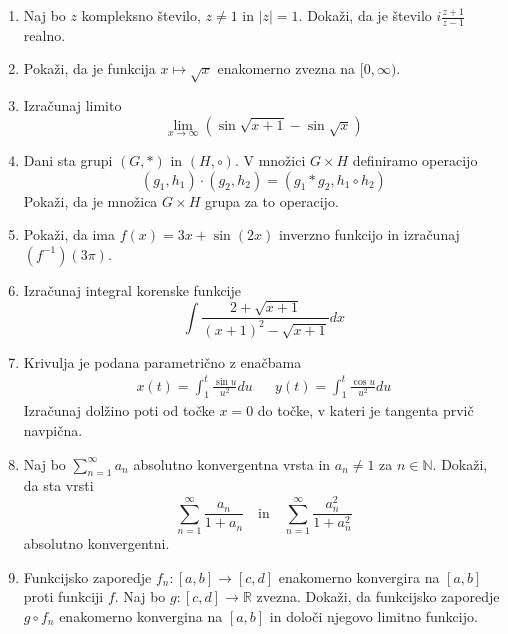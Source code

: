 \documentclass[a4paper,12pt]{article}
\begin{document}
\begin{enumerate}
    \item Naj bo \(z\) kompleksno število, \(z \neq 1\) in \(\left| z \right| = 1\). Dokaži, da je število \(i \frac{z + 1}{z - 1}\) realno.

    \item Pokaži, da je funkcija \(x \mapsto \sqrt{x}\) enakomerno zvezna na \([0, \infty)\).

    \item Izračunaj limito 
            \[
                \lim_{x \rightarrow \infty}{(\sin\sqrt{x + 1} - \sin\sqrt{x})}
            \]

    \item Dani sta grupi \((G, \ast)\) in \((H, \circ)\). V množici \(G \times H\) definiramo operacijo \[
       (g_1, h_1) \cdot (g_2, h_2) = (g_1 \ast g_2, h_1 \circ h_2) 
    \]
        Pokaži, da je množica \(G \times H\) grupa za to operacijo.

    \item Pokaži, da ima \(f(x) = 3x + \sin(2x)\) inverzno funkcijo in izračunaj \((f^{-1})(3\pi)\).

    \item Izračunaj integral korenske funkcije \[
        \int{\frac{2+\sqrt{x + 1}}{(x+1)^2 - \sqrt{x + 1}}dx}
    \]

    \item {
        Krivulja je podana parametrično z enačbama
        \begin{align}
            x(t) = \int_1^t{\frac{\sin u}{u^2}du} && y(t) = \int_1^t{\frac{\cos{u}}{u^2}du} \nonumber
        \end{align}
        Izračunaj dolžino poti od točke \(x = 0\) do točke, v kateri je tangenta prvič navpična.
    }

    \item {
        Naj bo \(\sum_{n=1}^{\infty} a_n\) absolutno konvergentna vrsta in \(a_n \neq 1\) za \(n \in \mathbb{N}\).
        Dokaži, da sta vrsti 
        \[
            \sum_{n=1}^{\infty}{\frac{a_n}{1 + a_n}} \quad \text{in} \quad \sum_{n=1}^{\infty}{\frac{a_n^2}{1 + a_n^2}} \nonumber
        \]
        absolutno konvergentni.
    }
        
    \item {
        Funkcijsko zaporedje $f_n : [a,b] \rightarrow [c,d]$ enakomerno konvergira na $[a,b]$ proti funkciji $f$.
        Naj bo $g:[c,d] \rightarrow \mathbb{R}$ zvezna. Dokaži, da funkcijsko zaporedje $g \circ f_n$
        enakomerno konvergina na $[a,b]$ in določi njegovo limitno funkcijo.
    }


\end{enumerate}
\end{document}
